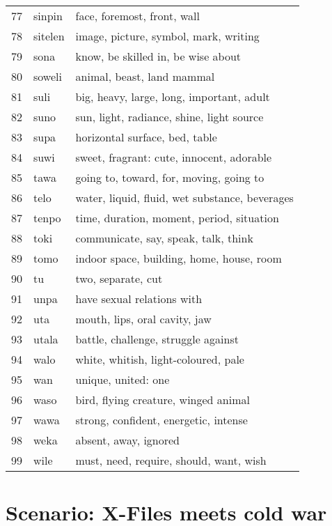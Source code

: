 \documentclass[11pt]{article}
\begin{document}
{\begin{multicols}{2}[]
\begin{center}
\begin{tabularx}{\linewidth}{rlX}
77 & sinpin & face, foremost, front, wall\\[0pt]
78 & sitelen & image, picture, symbol, mark, writing\\[0pt]
79 & sona & know, be skilled in, be wise about\\[0pt]
80 & soweli & animal, beast, land mammal\\[0pt]
81 & suli & big, heavy, large, long, important, adult\\[0pt]
82 & suno & sun, light, radiance, shine, light source\\[0pt]
83 & supa & horizontal surface, bed, table\\[0pt]
84 & suwi & sweet, fragrant: cute, innocent, adorable\\[0pt]
85 & tawa & going to, toward, for, moving, going to\\[0pt]
86 & telo & water, liquid, fluid, wet substance, beverages\\[0pt]
87 & tenpo & time, duration, moment, period, situation\\[0pt]
88 & toki & communicate, say, speak, talk, think\\[0pt]
89 & tomo & indoor space, building, home, house, room\\[0pt]
90 & tu & two, separate, cut\\[0pt]
91 & unpa & have sexual relations with\\[0pt]
92 & uta & mouth, lips, oral cavity, jaw\\[0pt]
93 & utala & battle, challenge, struggle against\\[0pt]
94 & walo & white, whitish, light-coloured, pale\\[0pt]
95 & wan & unique, united: one\\[0pt]
96 & waso & bird, flying creature, winged animal\\[0pt]
97 & wawa & strong, confident, energetic, intense\\[0pt]
98 & weka & absent, away, ignored\\[0pt]
99 & wile & must, need, require, should, want, wish\\[0pt]
\end{tabularx}
\end{center}
\end{multicols}
\normalsize



\section{Scenario: X-Files meets cold war}
\label{sec:orga0f41a9}

}
\end{document}
